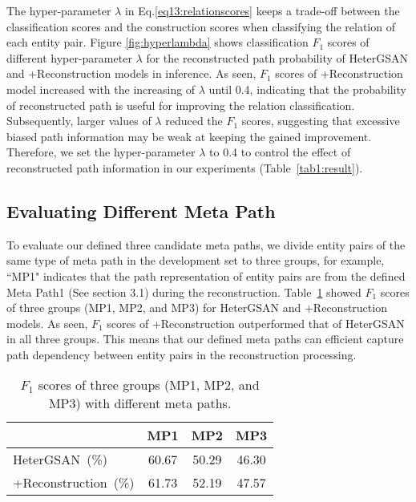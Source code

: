 \documentclass[letterpaper]{article} \usepackage{aaai21}  \usepackage{times}  \usepackage{helvet} \usepackage{courier}  \usepackage[hyphens]{url}  \usepackage{graphicx} \urlstyle{rm} \def\UrlFont{\rm}  \usepackage{natbib}  \usepackage{caption} \frenchspacing  \setlength{\pdfpagewidth}{8.5in}  \setlength{\pdfpageheight}{11in}  \usepackage{amsmath}
\begin{document}
The hyper-parameter $\lambda$ in Eq.\eqref{eq13:relationscores} keeps a trade-off between the classification scores and the construction scores when classifying the relation of each entity pair.
Figure \ref{fig:hyperlambda} shows classification $F_1$ scores of different hyper-parameter $\lambda$ for the reconstructed path probability of HeterGSAN and +Reconstruction models in inference.
As seen, $F_1$ scores of +Reconstruction model increased with the increasing of $\lambda$ until 0.4, indicating that the probability of reconstructed path is useful for improving the relation classification.
Subsequently, larger values of $\lambda$ reduced the $F_1$ scores, suggesting that excessive biased path information may be weak at keeping the gained improvement.
Therefore, we set the hyper-parameter $\lambda$ to 0.4 to control the effect of reconstructed path information in our experiments (Table~\ref{tab1:result}).


\subsection{Evaluating Different Meta Path}
To evaluate our defined three candidate meta paths, we divide entity pairs of the same type of meta path in the development set to three groups, for example, ``MP1" indicates that the path representation of entity pairs are from the defined Meta Path1 (See section 3.1) during the reconstruction.   
Table~\ref{tab5:pathlen} showed $F_1$ scores of three groups (MP1, MP2, and MP3) for HeterGSAN and +Reconstruction models.
As seen, $F_1$ scores of +Reconstruction outperformed that of HeterGSAN in all three groups.
This means that our defined meta paths can efficient capture path dependency between entity pairs in the reconstruction processing.
\begin{table}[h]
    \begin{center}
        \begin{tabular}{l|c|c|c}
& MP1 & MP2 & MP3 \\ \hline
        HeterGSAN~(\%)       & 60.67                      & 50.29 & 46.30 \\
        \;\;\;\;+Reconstruction~(\%) & 61.73                      & 52.19 & 47.57 \\ \end{tabular}
    \end{center}
    \caption{\label{tab5:pathlen}$F_1$ scores of three groups (MP1, MP2, and MP3) with different meta paths.}
\end{table}
\end{document}
